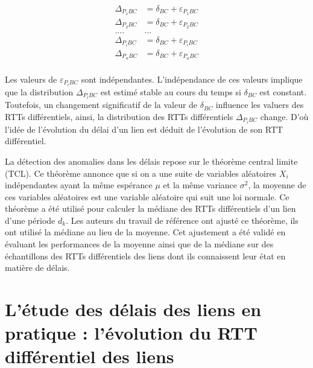  
 \begin{align*}
 \Delta_{P_{1}BC} &= \delta_{BC} + \varepsilon_{P_{1}BC}\\
  \Delta_{P_{2}BC} &= \delta_{BC} + \varepsilon_{P_{2}BC}\\
  .... &   ... \\
   \Delta_{P_{i}BC} &= \delta_{BC} + \varepsilon_{P_{i}BC}\\
      \Delta_{P_{n}BC} &= \delta_{BC} + \varepsilon_{P_{n}BC}\\
 \end{align*}
 
Les valeurs de  $\varepsilon_{P_{i}BC}$ sont  indépendantes. L'indépendance de ces valeurs implique que la distribution $\Delta_{P_{i}BC}$ est estimé  stable au cours du temps si $\delta_{BC}$ est constant. Toutefois, un changement significatif de la valeur de $\delta_{BC}$ influence les valuers des RTTs différentiels, ainsi,  la distribution des RTTs différentiels $\Delta_{P_{i}BC}$ change. D'où l'idée de l'évolution du délai d'un lien est déduit de l'évolution de son RTT différentiel.


La détection des anomalies dans les délais repose sur le théorème  central limite (TCL). Ce théorème  annonce que si on a une suite de variables aléatoires $X_i$ indépendantes ayant la même espérance $\mu$ et la même variance $\sigma^2$, la moyenne de ces variables aléatoires est une variable aléatoire qui suit une loi normale. Ce théorème a été utilisé pour calculer la médiane des RTTs différentiels d'un lien d'une période $d_k$. Les auteurs du travail de référence ont ajusté ce théorème, ils ont utilisé la médiane au lieu de la moyenne. Cet ajustement  a été validé en évaluant les performances de la moyenne ainsi que de la médiane sur des échantillons des RTTs différentiels des liens  dont ils connaissent leur état en matière de délais.




\section{L'étude des délais des liens en pratique : l'évolution du RTT différentiel des liens}

